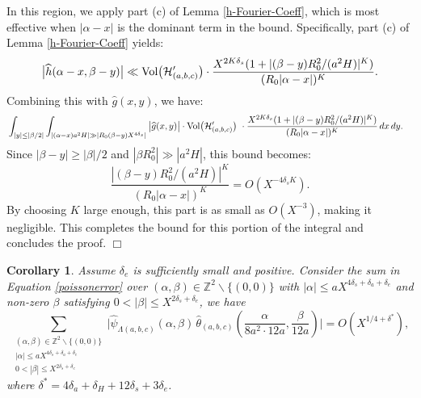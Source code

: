 \documentclass{article}
\def\Z{{\mathbb Z}}
\def\Vol{{\rm Vol}}
\def\H{{\mathcal H}}
\def\Z{{\mathbb Z}}
\def\H{{\mathcal H}}
\newtheorem{cor}[theorem]{Corollary}
\newenvironment{proof}{\noindent {\bf Proof:}}{$\Box$ \vspace{2 ex}}
\begin{document}
\begin{proof}
In this region, we apply part (c) of Lemma \ref{h-Fourier-Coeff}, which is most effective when $|\alpha - x|$ is the dominant term in the bound. Specifically, part (c) of Lemma \ref{h-Fourier-Coeff} yields:
\begin{equation*}
\big|\widehat{h}(\alpha - x, \beta - y)\big| \ll \Vol\big(\H'_{(a,b,c)}\big)\cdot \frac{X^{2K \delta_s}(1 + |(\beta - y) R_0^2 / (a^2 H)|^K)}{(R_0 |\alpha - x|)^K}.
\end{equation*}
Combining this with $\widehat{g}(x, y)$, we have:
\begin{align*}
    &\int_{|y| \leq |\beta/2|} \int_{|(\alpha - x)a^2 H| \gg |R_0 (\beta - y) X^{4\delta_s}|} \big|\widehat{g}(x, y) \big| \cdot\Vol\big(\H'_{(a,b,c)}\big)\ \cdot \frac{X^{2K \delta_s}(1 + |(\beta - y) R_0^2 / (a^2 H)|^K)}{(R_0 |\alpha - x|)^K} \, dx \, dy.
\end{align*}
Since $|\beta - y| \geq |\beta|/2$ and $|\beta R_0^2| \gg |a^2 H|$, this bound becomes:
\begin{equation*}
\frac{|(\beta - y) R_0^2 / (a^2 H)|^K}{(R_0 |\alpha - x|)^K} = O(X^{-4\delta_s K}).
\end{equation*}
By choosing $K$ large enough, this part is as small as $O(X^{-3})$, making it negligible. This completes the bound for this portion of the integral and concludes the proof.
\end{proof}
\begin{cor}\label{beta-nonzero}
   Assume $\delta_e$ is sufficiently small and positive. Consider the sum in Equation \eqref{poissonerror} over $(\alpha, \beta) \in \mathbb{Z}^2 \backslash \{(0, 0)\}$ with $|\alpha| \leq aX^{4\delta_s + \delta_a + \delta_e}$ and non-zero $\beta$ satisfying $0 < |\beta| \leq X^{2\delta_s + \delta_e}$, we have \begin{equation*} \sum_{\substack{(\alpha, \beta) \in \Z^2 \backslash\{(0, 0)
\} \\ |\alpha| \leq aX^{4\delta_s + \delta_a + \delta_e} \\ 0 < |\beta| \leq X^{2\delta_s + \delta_e}}} \Big|  \widehat{\psi}_{\Lambda(a, b, c)}(\alpha, \beta) \, \widehat{\theta}_{(a, b, c)}\left(\frac{\alpha}{8a^2 \cdot 12a}, \frac{\beta}{12a}\right) \Big| = O(X^{1/4 + \delta^*}), \end{equation*}
where $\delta^* = 4\delta_a + \delta_H + 12\delta_s + 3\delta_e$.
\end{cor}
\end{document}
